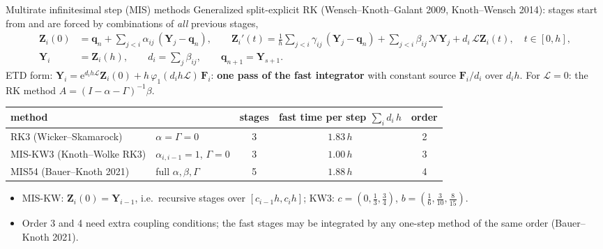 \documentclass[aspectratio=169,10pt]{beamer}
\newcommand{\ee}{\mathrm{e}}
\newcommand{\bq}{\mathbf{q}}
\newcommand{\LL}{\mathcal{L}}   %
\newcommand{\NN}{\mathcal{N}}   %
\newcommand{\ph}{\varphi}
\begin{document}
\begin{frame}{Multirate infinitesimal step (MIS) methods}
  \footnotesize
  Generalized split-explicit RK (Wensch--Knoth--Galant 2009, Knoth--Wensch 2014): stages start from and are forced by
  combinations of \emph{all} previous stages,
  \begin{align*}
    \mathbf Z_i(0) &= \bq_n+\sum_{j<i}\alpha_{ij}\,(\mathbf Y_j-\bq_n),\qquad
    \mathbf Z_i'(t) = \frac1h\sum_{j<i}\gamma_{ij}\,(\mathbf Y_j-\bq_n)+\sum_{j<i}\beta_{ij}\,\NN\mathbf Y_j+d_i\,\LL\mathbf Z_i(t),\quad t\in[0,h],\\
    \mathbf Y_i &= \mathbf Z_i(h),\qquad d_i=\sum_j\beta_{ij},\qquad \bq_{n+1}=\mathbf Y_{s+1}.
  \end{align*}
  ETD form: $\mathbf Y_i=\ee^{d_ih\LL}\mathbf Z_i(0)+h\,\ph_1(d_ih\LL)\,\mathbf F_i$: \textbf{one pass of the fast integrator} with constant source $\mathbf F_i/d_i$ over $d_ih$.
  For $\LL=0$: the RK method $A=(I-\alpha-\Gamma)^{-1}\beta$.
  \medskip
  \begin{center}
  \begin{tabular}{llccc}
    \toprule
    method & & stages & fast time per step $\sum_i d_i\,h$ & order\\
    \midrule
    RK3 (Wicker--Skamarock) & $\alpha=\Gamma=0$ & 3 & $1.83\,h$ & 2\\
    MIS-KW3 (Knoth--Wolke RK3) & $\alpha_{i,i-1}=1$, $\Gamma=0$ & 3 & $1.00\,h$ & 3\\
    MIS54 (Bauer--Knoth 2021) & full $\alpha,\beta,\Gamma$ & 5 & $1.88\,h$ & 4\\
    \bottomrule
  \end{tabular}
  \end{center}
  \begin{itemize}
    \item MIS-KW: $\mathbf Z_i(0)=\mathbf Y_{i-1}$, i.e.\ recursive stages over $[c_{i-1}h,c_ih]$; KW3: $c=(0,\tfrac13,\tfrac34)$, $b=(\tfrac16,\tfrac3{10},\tfrac8{15})$.
    \item Order 3 and 4 need extra coupling conditions; the fast stages may be integrated by any one-step method of the same order (Bauer--Knoth 2021).
  \end{itemize}
\end{frame}
\end{document}
